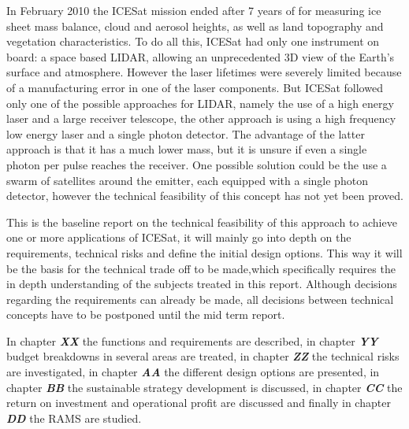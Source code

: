 In February 2010 the ICESat mission ended after 7 years of for measuring ice sheet mass balance, cloud and aerosol heights, as well as land topography and vegetation characteristics.
To do all this, ICESat had only one instrument on board: a space based LIDAR, allowing an unprecedented 3D view of the Earth's surface and atmosphere.
However the laser lifetimes were severely limited because of a manufacturing error in one of the laser components.
But ICESat followed only one of the possible approaches for LIDAR, namely the use of a high energy laser and a large receiver telescope, the other approach is using a high frequency low energy laser and a single photon detector. The advantage of the latter approach is that it has a much lower mass, but it is unsure if even a single photon per pulse reaches the receiver. One possible solution could be the use a swarm of satellites around the emitter, each equipped with a single photon detector, however the technical feasibility of this concept has not yet been proved.

This is the baseline report on the technical feasibility of this approach to achieve one or more applications of ICESat, it will mainly go into depth on the requirements, technical risks and define the initial design options. This way it will be the basis for the technical trade off to be made,which specifically requires the in depth understanding of the subjects treated in this report. Although decisions regarding the requirements can already be made, all decisions between technical concepts have to be postponed until the mid term report.

In chapter \emph{\textbf{\textit{XX}}} the functions and requirements are described, in chapter \emph{\textbf{\textit{YY}}} budget breakdowns in several areas are treated, in chapter \emph{\textbf{\textit{ZZ}}} the technical risks are investigated, in chapter \emph{\textbf{\textit{AA}}} the different design options are presented, in chapter \emph{\textbf{\textit{BB}}} the sustainable strategy development is discussed, in chapter \emph{\textbf{\textit{CC}}} the return on investment and operational profit are discussed and finally in chapter \emph{\textbf{\textit{DD}}} the RAMS are studied.